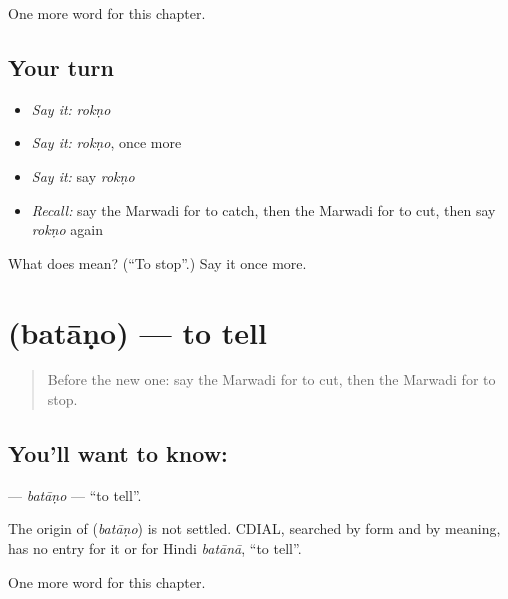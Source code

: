 \begin{grammarlens}[title={What you've built}]
One more word for this chapter.
\end{grammarlens}

\subsection*{Your turn}
\begin{itemize}
\raggedright
  \item \emph{Say it:} \emph{rokṇo}
  \item \emph{Say it:} \emph{rokṇo}, once more
  \item \emph{Say it:} say \emph{rokṇo}
  \item \emph{Recall:} say the Marwadi for to catch, then the Marwadi for to cut, then say \emph{rokṇo} again
\end{itemize}

\begin{tcolorbox}[breakable,colback=teal!4,colframe=teal!35!black,title={Before you move on}]
What does  mean? (\textquotedblleft{}To stop\textquotedblright{}.) Say it once more.
\end{tcolorbox}
\section[\texorpdfstring{\mw{बताणो} (batāṇo)}{बताणो (batāṇo)}]{ (batāṇo) — to tell}

\label{lesson:MW-C56-batano}



\begin{quote}
Before the new one: say the Marwadi for to cut, then the Marwadi for to stop.
\end{quote}

\subsection*{You'll want to know: }
\textbf{} — \emph{batāṇo} — \textquotedblleft{}to tell\textquotedblright{}.

\begin{cousinweb}
The origin of \textbf{} (\emph{batāṇo}) is not settled. CDIAL, searched by form and by meaning, has no entry for it or for Hindi \emph{batānā}, \textquotedblleft{}to tell\textquotedblright{}.
\end{cousinweb}

\begin{grammarlens}[title={What you've built}]
One more word for this chapter.
\end{grammarlens}

